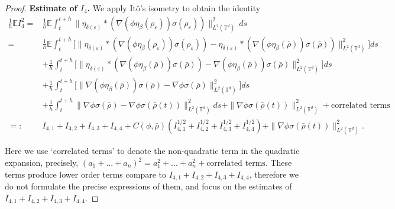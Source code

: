 \documentclass[UTF-8,reqno]{amsart}
\numberwithin{equation}{section}
\begin{document}
\begin{proof}
\noindent\textbf{Estimate of $ I_4 $.} We apply It\^o's isometry to obtain the identity
\begin{align*}
	\frac{1}{h}\mathbb{E}I_4^2=&\frac{1}{h}\mathbb{E}\int_{t}^{t+h}\|\eta_{\delta(\varepsilon)} \ast (\nabla(\phi \eta_{\beta}(\rho_{\varepsilon})) \sigma(\rho_{\varepsilon}))\|_{L^2(\mathbb{T}^d)}^2 \, ds \\
	=&\frac{1}{h}\mathbb{E}\int_{t}^{t+h} \Big[ \|\eta_{\delta(\varepsilon)} \ast (\nabla(\phi \eta_{\beta}(\rho_{\varepsilon})) \sigma(\rho_{\varepsilon}))-\eta_{\delta(\varepsilon)} \ast (\nabla(\phi \eta_{\beta}(\bar{\rho})) \sigma(\bar{\rho}))\|_{L^2(\mathbb{T}^d)}^2 \Big] ds \\
	&+ \frac{1}{h} \int_{t}^{t+h} \Big[ \|\eta_{\delta(\varepsilon)} \ast (\nabla(\phi \eta_{\beta}(\bar{\rho})) \sigma(\bar{\rho}))-\nabla(\phi \eta_{\beta}(\bar{\rho})) \sigma(\bar{\rho})\|_{L^2(\mathbb{T}^d)}^2 \Big] ds \\
	&+ \frac{1}{h} \int_{t}^{t+h} \Big[ \|\nabla(\phi \eta_{\beta}(\bar{\rho})) \sigma(\bar{\rho})-\nabla\phi \sigma(\bar{\rho})\|_{L^2(\mathbb{T}^d)}^2 \Big] ds \\
	&+ \frac{1}{h} \int_{t}^{t+h} \|\nabla\phi \sigma(\bar{\rho})-\nabla\phi \sigma(\bar{\rho}(t))\|_{L^2(\mathbb{T}^d)}^2ds + \|\nabla\phi \sigma(\bar{\rho}(t))\|_{L^2(\mathbb{T}^d)}^2+\text{correlated terms} \\
	=:& I_{4,1} + I_{4,2} + I_{4,3} + I_{4,4} + C(\phi,\bar{\rho})(I_{4,1}^{1/2} + I_{4,2}^{1/2} + I_{4,3}^{1/2} + I_{4,4}^{1/2})+ \|\nabla\phi \sigma(\bar{\rho}(t))\|_{L^2(\mathbb{T}^d)}^2.
\end{align*}

Here we use `correlated terms' to denote the non-quadratic term in the quadratic expansion, precisely, $(a_1+...+a_n)^2=a_1^2+...+a_n^2+{\text{correlated terms}}$. These terms produce lower order terms compare to $I_{4,1} + I_{4,2} + I_{4,3} + I_{4,4}$, therefore we do not formulate the precise expressions of them, and focus on the estimates of $I_{4,1} + I_{4,2} + I_{4,3} + I_{4,4}$. 


\end{proof}
\end{document}
